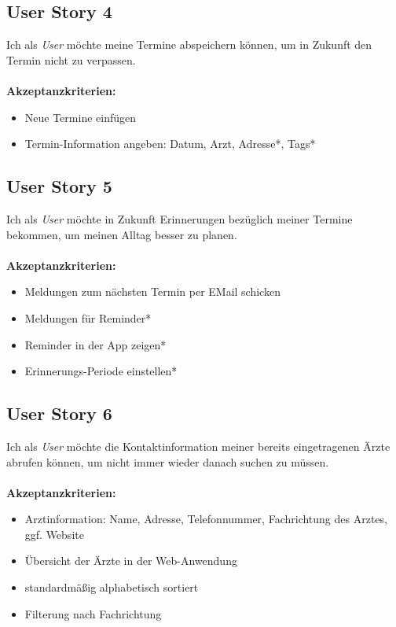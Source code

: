 \documentclass[conference]{IEEEtran}
\begin{document}
\subsection{User Story 4}
Ich als \textit{User} möchte meine Termine abspeichern können, um in Zukunft den Termin nicht zu verpassen.\\\\
\textbf{Akzeptanzkriterien:}
\begin{itemize}
	\item Neue Termine einfügen
	\item Termin-Information angeben: Datum, Arzt, Adresse*, Tags*
\end{itemize}


\subsection{User Story 5}
Ich als \textit{User} möchte in Zukunft Erinnerungen bezüglich meiner Termine bekommen, um meinen Alltag besser zu planen.\\\\
\textbf{Akzeptanzkriterien:}
\begin{itemize}
	\item Meldungen zum nächsten Termin per EMail schicken
	\item Meldungen für Reminder*
	\item Reminder in der App zeigen*
	\item Erinnerungs-Periode einstellen*
\end{itemize}

\subsection{User Story 6}
Ich als \textit{User} möchte die Kontaktinformation meiner bereits eingetragenen Ärzte abrufen können, um nicht immer wieder danach suchen zu müssen.\\\\
\textbf{Akzeptanzkriterien:}
\begin{itemize}
	\item Arztinformation: Name, Adresse, Telefonnummer, Fachrichtung des Arztes, ggf. Website 
	\item Übersicht der Ärzte in der Web-Anwendung
	\item standardmäßig alphabetisch sortiert
	\item Filterung nach Fachrichtung
\end{itemize}
\end{document}
